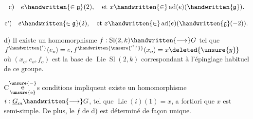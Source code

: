 \[
\text{c)}\quad e\handwritten{\in\mathfrak{g}}(2),\quad\text{et }x\handwritten{\in}\operatorname{ad}(e)(\handwritten{\mathfrak{g}}).
\]

\[
\text{c')}\quad e\handwritten{\in\mathfrak{g}}(2),\quad\text{et }x\handwritten{\in}\operatorname{ad}(e)(\handwritten{\mathfrak{g}}(-2)).
\]

d) Il existe un homomorphisme $f:\operatorname{Sl}(2,k)\handwritten{\longrightarrow}G$ tel que $f^{\handwritten{'}}(e_o)=e,f^{\handwritten{\unsure{''|'}}}(x_o)=x\deleted{\unsure{y}}$ où $(x_o,e_o,f_o)$ est la base de $\operatorname{Lie}\operatorname{Sl}(2,k)$ correspondant à l'épinglage habituel de ce groupe.

C$\overset{\unsure{-}}{\underset{\text{\unsure{e}}}{\text{e}}}$s conditions impliquent  existe un homomorphisme $i:\underline{G}_m\handwritten{\longrightarrow}G$, tel que $\operatorname{Lie}(i)(1)=x$, a fortiori que $x$ est semi-simple. De plus, le $f$ de d) est déterminé de façon unique.

